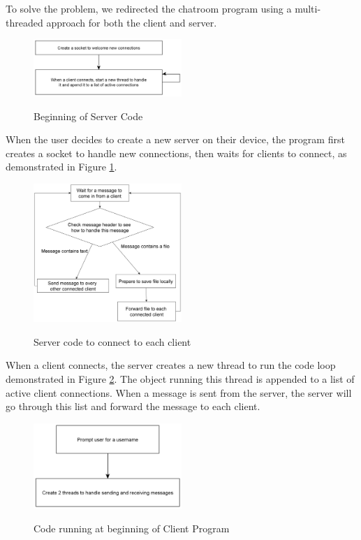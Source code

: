 \documentclass{article}
\begin{document}
To solve the problem, we redirected the chatroom program using a multi-threaded approach for both the client and server.

\begin{figure}[h]
\caption{Beginning of Server Code}
\centering
\includegraphics[width=0.5\textwidth]{media/serverFlowchart2.png}
\label{server2}
\end{figure}

When the user decides to create a new server on their device, the program first creates a socket to handle new connections, then waits for clients to connect, as demonstrated in Figure \ref{server2}.

\begin{figure}[h]
\caption{Server code to connect to each client}
\centering
\includegraphics[width=0.5\textwidth]{media/serverFlowchart1.png}
\label{server1}
\end{figure}

When a client connects, the server creates a new thread to run the code loop demonstrated in Figure \ref{server1}. The object running this thread is appended to a list of active client connections. When a message is sent from the server, the server will go through this list and forward the message to each client.

\begin{figure}[h]
\caption{Code running at beginning of Client Program}
\centering
\includegraphics[width=0.5\textwidth]{media/clientFlowchart2.png}
\label{client2}
\end{figure}
\end{document}
